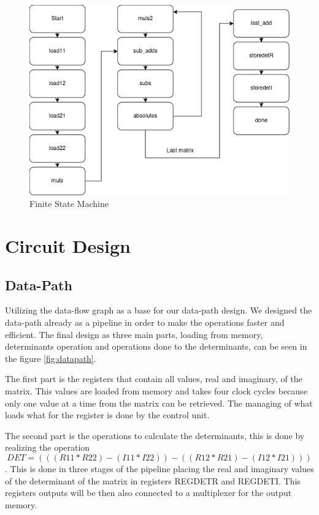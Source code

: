 \documentclass[12pt]{article}
\begin{document}
\begin{figure}[H]
	\centering
	\includegraphics[width=0.55\linewidth]{images/FSM_lab3.png}
	\caption{Finite State Machine}
	\label{fig:fsm}
\end{figure}

\section{Circuit Design}
\subsection{Data-Path}
Utilizing the data-flow graph as a base for our data-path design. We designed the data-path already as a pipeline in order to make the operations faster and efficient. The final design as three main parts, loading from memory, determinants operation and operations done to the determinants, can be seen in the figure \ref{fig:datapath}.

The first part is the registers that contain all values, real and imaginary, of the matrix. This values are loaded from memory and takes four clock cycles because only one value at a time from the matrix can be retrieved. The managing of what loads what for the register is done by the control unit.

The second part is the operations to calculate the determinants, this is done by realizing the operation $$DET=(((R11*R22)-(I11*I22))-((R12*R21)-(I12*I21))) $$. This is done in three stages of the pipeline placing the real and imaginary values of the determinant of the matrix in registers REG\textunderscore DETR and REG\textunderscore DETI. This registers outputs will be then also connected to a multiplexer for the output memory.
\end{document}
